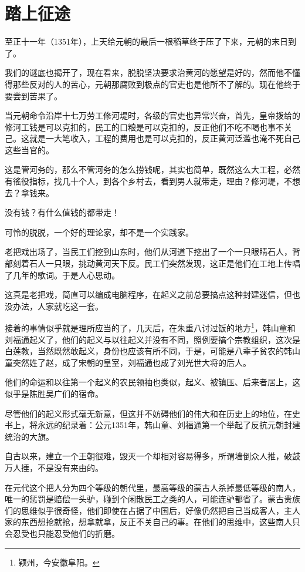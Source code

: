 \section{踏上征途}
\ifnum{}
	\begin{multicols}{\theparacolNo}
		\fi
		至正十一年（1351年），上天给元朝的最后一根稻草终于压了下来，元朝的末日到了。

		我们的谜底也揭开了，现在看来，脱脱坚决要求治黄河的愿望是好的，然而他不懂得那些反对的人的苦心，元朝那腐败到极点的官吏也是他所不了解的。现在他终于要尝到苦果了。

		当元朝命令沿岸十七万劳工修河堤时，各级的官吏也异常兴奋，首先，皇帝拨给的修河工钱是可以克扣的，民工的口粮是可以克扣的，反正他们不吃不喝也事不关己。这就是一大笔收入，工程的费用也是可以克扣的，反正黄河泛滥也淹不死自己这些当官的。

		这是管河务的，那么不管河务的怎么捞钱呢，其实也简单，既然这么大工程，必然有徭役指标，找几十个人，到各个乡村去，看到男人就带走，理由？修河堤，不想去？拿钱来。

		没有钱？有什么值钱的都带走！

		可怜的脱脱，一个好的理论家，却不是一个实践家。

		老把戏出场了，当民工们挖到山东时，他们从河道下挖出了一个一只眼睛石人，背部刻着石人一只眼，挑动黄河天下反。民工们突然发现，这正是他们在工地上传唱了几年的歌词。于是人心思动。

		这真是老把戏，简直可以编成电脑程序，在起义之前总要搞点这种封建迷信，但也没办法，人家就吃这一套。

		接着的事情似乎就是理所应当的了，几天后，在朱重八讨过饭的地方\footnote{颖州，今安徽阜阳。}，韩山童和刘福通起义了，他们的起义与以往起义并没有不同，照例要搞个宗教组织，这次是白莲教，当然既然敢起义，身份也应该有所不同，于是，可能是八辈子贫农的韩山童突然姓了赵，成了宋朝的皇室，刘福通也成了刘光世大将的后人。

		他们的命运和以往第一个起义的农民领袖也类似，起义、被镇压、后来者居上，这似乎是陈胜吴广们的宿命。

		尽管他们的起义形式毫无新意，但这并不妨碍他们的伟大和在历史上的地位，在史书上，将永远的纪录着：公元1351年，韩山童、刘福通第一个举起了反抗元朝封建统治的大旗。

		自古以来，建立一个王朝很难，毁灭一个却相对容易得多，所谓墙倒众人推，破鼓万人捶，不是没有来由的。

		在元代这个把人分为四个等级的朝代里，最高等级的蒙古人杀掉最低等级的南人，唯一的惩罚是赔偿一头驴，碰到个闲散民工之类的人，可能连驴都省了。蒙古贵族们的思维似乎很奇怪，他们即使在占据了中国后，好像仍然把自己当成客人，主人家的东西想抢就抢，想拿就拿，反正不关自己的事。在他们的思维中，这些南人只会忍受也只能忍受他们的折磨。


\end{multicols}
